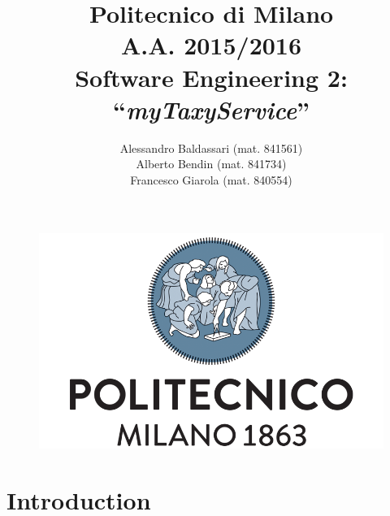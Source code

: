 \documentclass[a4paper,11pt]{report} %
\title{Politecnico di Milano\\A.A. 2015/2016\\Software Engineering 2: ``{\em myTaxyService}''}
\author{Alessandro Baldassari (mat. 841561) \\ Alberto Bendin (mat. 841734) \\ Francesco Giarola (mat. 840554)}
\begin{document}
	
	
	\begin{figure}[t]
		\centering
		\includegraphics[width=1\linewidth]{"Pictures/polimi-logo"}
		\label{fig:polimi-logo}
	\end{figure}
	
	\maketitle
		
	
	\thispagestyle{empty}
	\clearpage\mbox{}\clearpage
	
	
	
	\renewcommand*\thesection{\arabic{section}}
	\renewcommand*\thesubsection{\arabic{section}.\arabic{subsection}}
	\renewcommand*\thesubsubsection{%
	\arabic{section}.\arabic{subsection}.\arabic{subsubsection}%
	}
	\setcounter{secnumdepth}{4}
	\setcounter{tocdepth}{4}
		
	
	\tableofcontents
	\newpage
	
	
	
	\section{Introduction}
	
\end{document}
